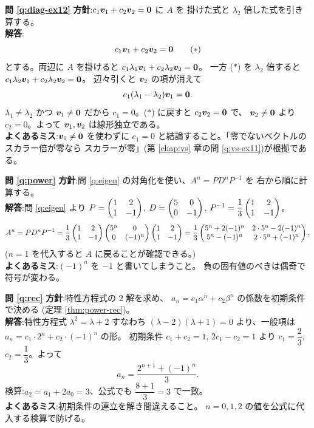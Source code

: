 \bigskip
\noindent\textbf{問 \ref{q:diag-ex12}}\quad
\textbf{方針}:$c_1\bm{v}_1 + c_2\bm{v}_2 = \bm{0}$ に $A$ を
掛けた式と $\lambda_2$ 倍した式を引き算する。\\
\textbf{解答}:
\[
c_1\bm{v}_1 + c_2\bm{v}_2 = \bm{0}
\tag{$*$}
\]
とする。両辺に $A$ を掛けると
$c_1\lambda_1\bm{v}_1 + c_2\lambda_2\bm{v}_2 = \bm{0}$。
一方 ($*$) を $\lambda_2$ 倍すると
$c_1\lambda_2\bm{v}_1 + c_2\lambda_2\bm{v}_2 = \bm{0}$。
辺々引くと $\bm{v}_2$ の項が消えて
\[
c_1(\lambda_1 - \lambda_2)\bm{v}_1 = \bm{0}.
\]
$\lambda_1 \neq \lambda_2$ かつ $\bm{v}_1 \neq \bm{0}$ だから
$c_1 = 0$。($*$) に戻すと $c_2\bm{v}_2 = \bm{0}$ で、
$\bm{v}_2 \neq \bm{0}$ より $c_2 = 0$。よって
$\bm{v}_1, \bm{v}_2$ は線形独立である。\\
\textbf{よくあるミス}:$\bm{v}_1 \neq \bm{0}$ を使わずに
$c_1 = 0$ と結論すること。「零でないベクトルのスカラー倍が零なら
スカラーが零」(第 \ref{chap:vs} 章の問 \ref{q:vs-ex11})が根拠である。

\bigskip
\noindent\textbf{問 \ref{q:power}}\quad
\textbf{方針}:問 \ref{q:eigen} の対角化を使い、$A^n = PD^nP^{-1}$ を
右から順に計算する。\\
\textbf{解答}:問 \ref{q:eigen} より $P = \begin{pmatrix}1 & 2 \\ 1 & -1\end{pmatrix}$,
$D = \begin{pmatrix}5 & 0 \\ 0 & -1\end{pmatrix}$, $P^{-1} = \dfrac{1}{3}\begin{pmatrix}1 & 2 \\ 1 & -1\end{pmatrix}$。
\[
A^n = P D^n P^{-1}
= \frac{1}{3}\begin{pmatrix}1 & 2 \\ 1 & -1\end{pmatrix}\begin{pmatrix}5^n & 0 \\ 0 & (-1)^n\end{pmatrix}\begin{pmatrix}1 & 2 \\ 1 & -1\end{pmatrix}
= \frac{1}{3}\begin{pmatrix}5^n + 2(-1)^n & 2 \cdot 5^n - 2(-1)^n \\
5^n - (-1)^n & 2 \cdot 5^n + (-1)^n\end{pmatrix}.
\]
($n = 1$ を代入すると $A$ に戻ることが確認できる。)\\
\textbf{よくあるミス}:$(-1)^n$ を $-1$ と書いてしまうこと。
負の固有値のべきは偶奇で符号が変わる。

\bigskip
\noindent\textbf{問 \ref{q:rec}}\quad
\textbf{方針}:特性方程式の $2$ 解を求め、
$a_n = c_1\alpha^n + c_2\beta^n$ の係数を初期条件で決める
(定理 \ref{thm:power-rec})。\\
\textbf{解答}:特性方程式 $\lambda^2 = \lambda + 2$ すなわち
$(\lambda - 2)(\lambda + 1) = 0$ より、一般項は
$a_n = c_1 \cdot 2^n + c_2 \cdot (-1)^n$ の形。
初期条件 $c_1 + c_2 = 1$, $2c_1 - c_2 = 1$ より
$c_1 = \dfrac{2}{3}$, $c_2 = \dfrac{1}{3}$。よって
\[
a_n = \frac{2^{n+1} + (-1)^n}{3}.
\]
検算:$a_2 = a_1 + 2a_0 = 3$、公式でも $\dfrac{8 + 1}{3} = 3$ で一致。\\
\textbf{よくあるミス}:初期条件の連立を解き間違えること。
$n = 0, 1, 2$ の値を公式に代入する検算で防げる。

